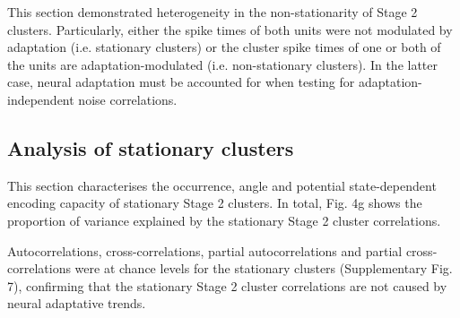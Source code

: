 \documentclass{article}
\begin{document}



This section demonstrated heterogeneity in the non-stationarity of Stage 2 clusters. Particularly, either the spike times of both units were not modulated by adaptation (i.e. stationary clusters) or the cluster spike times of one or both of the units are adaptation-modulated (i.e. non-stationary clusters). In the latter case, neural adaptation must be accounted for when testing for adaptation-independent noise correlations.


\subsection*{Analysis of stationary clusters}
This section characterises the occurrence, angle and potential state-dependent encoding capacity of stationary Stage 2 clusters.
In total, 
Fig. 4g shows the proportion of variance explained by the stationary Stage 2 cluster correlations.


Autocorrelations, cross-correlations, partial autocorrelations and partial cross-correlations were at chance levels for the stationary clusters (Supplementary Fig. 7), confirming that the stationary Stage 2 cluster correlations are not caused by neural adaptative trends.
\end{document}
